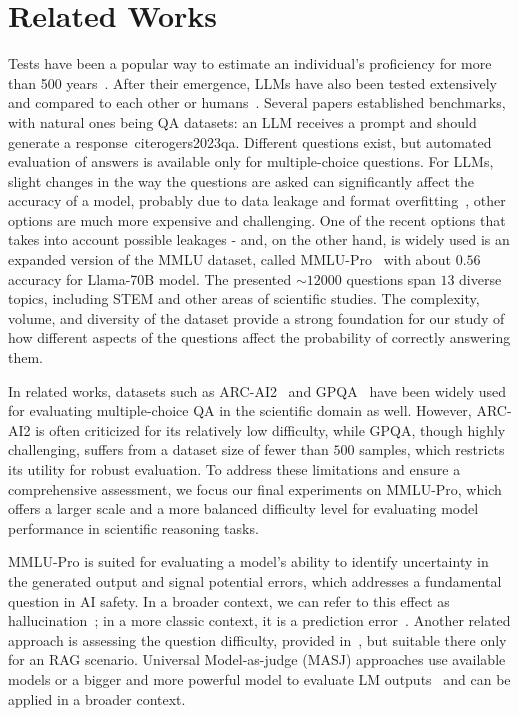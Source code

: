 \section{Related Works}

Tests have been a popular way to estimate an individual's proficiency for more than 500 years~\cite{buyske2005optimal}. 
After their emergence, LLMs have also been tested extensively and compared to each other or humans~\cite{sizov2024analysing}. 
Several papers established benchmarks, with natural ones being QA datasets: an LLM receives a prompt and should generate a response~cite{rogers2023qa}.
Different questions exist, but automated evaluation of answers is available only for multiple-choice questions.
For LLMs, slight changes in the way the questions are asked can significantly affect the accuracy of a model, probably due to data leakage and format overfitting~\cite{elhady2025wicked},
other options are much more expensive and challenging.
One of the recent options that takes into account possible leakages - and, on the other hand, is widely used is an expanded version of the MMLU dataset, called MMLU-Pro~\cite{wang2025mmlu} with about $0.56$ accuracy for Llama-70B model.
The presented $\sim 12 000$ questions span $13$ diverse topics, including STEM and other areas of scientific studies.
The complexity, volume, and diversity of the dataset provide a strong foundation for our study of how different aspects of the questions affect the probability of correctly answering them.






In related works, datasets such as ARC-AI2~\cite{clark2018think} and GPQA~\cite{rein2023gpqagraduatelevelgoogleproofqa} have been widely used for evaluating multiple-choice QA in the scientific domain as well. However, ARC-AI2 is often criticized for its relatively low difficulty, while GPQA, though highly challenging, suffers from a dataset size of fewer than $500$ samples, which restricts its utility for robust evaluation. To address these limitations and ensure a comprehensive assessment, we focus our final experiments on MMLU-Pro, which offers a larger scale and a more balanced difficulty level for evaluating model performance in scientific reasoning tasks.

MMLU-Pro is suited for evaluating a model's ability to identify uncertainty in the generated output and signal potential errors, which addresses a fundamental question in AI safety. 
In a broader context, we can refer to this effect as hallucination~\cite{huang2025survey}; in a more classic context, it is a prediction error~\cite{fadeeva2023lm}.
Another related approach is assessing the question difficulty, provided in~\cite{gabburo2024measuring}, but suitable there only for an RAG scenario. Universal Model-as-judge (MASJ) approaches use available models or a bigger and more powerful model to evaluate LM outputs~\cite{zheng2023judging} and can be applied in a broader context.

